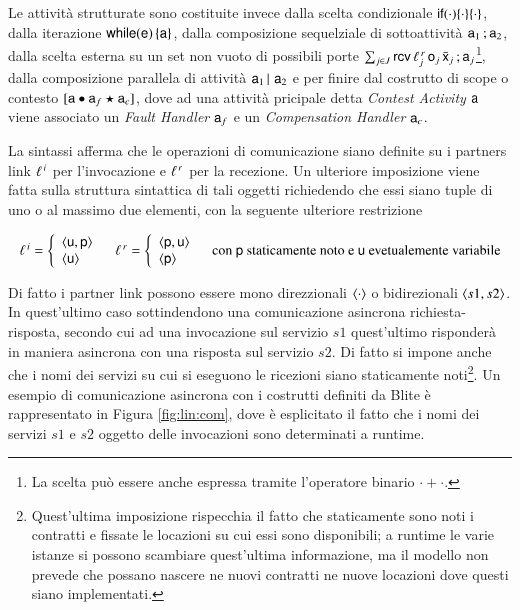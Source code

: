 Le attività strutturate sono costituite invece dalla scelta condizionale
${\sf if}(\cdot)\{ \cdot \}\{\cdot\}$, dalla iterazione ${\sf while}({\sf e})\, \{ {\sf a}\}$, dalla
composizione sequelziale di sottoattività ${\sf a}_1\, ;{\sf a}_2$, dalla scelta
esterna su un set non vuoto di possibili porte $\sum_{j \in
J}{\sf rcv}\,\ell^{\,r}_j\, {\sf o}_j\, \bar{{\sf x}}_j\, ;{\sf a}_j$\footnote{La scelta può
essere anche espressa tramite l'operatore binario $ \cdot + \cdot$.}, dalla
composizione parallela di attività ${\sf a}_1\,|\,\, {\sf a}_2$ e per finire dal costrutto di scope o contesto $[{\sf a} \bullet {\sf a}_f \star {\sf a}_c]$, dove ad una attività pricipale
detta \emph{Contest Activity} ${\sf a}$ viene associato un \emph{Fault Handler}
${\sf a}_f$ e un \emph{Compensation Handler} ${\sf a}_c$.

La sintassi afferma che le operazioni di comunicazione siano
definite su i partners link $\ell^{\,i}$ per l'invocazione e $\ell^{\,r}$ per la
recezione. Un ulteriore imposizione viene fatta sulla struttura sintattica di
tali oggetti richiedendo che essi siano tuple di uno o al massimo due elementi,
con la seguente ulteriore restrizione

$$
\begin{array}{ccc}

\plinv = \left\{ 
\begin{array}{l}
 \arr{\xu,\xp}   \\
 \arr{\xu}  
\end{array} \right.

&

\plrec = \left\{ 
\begin{array}{l}
 \arr{\xp,\xu}   \\
 \arr{\xp}  
\end{array} \right.

& \textrm{con } \xp \textrm{ staticamente noto e } \xu \textrm{
evetualemente variabile}

\end{array}
$$

Di fatto i partner link possono essere mono direzzionali $\langle \cdot \rangle$ o
bidirezionali $\langle s1, s2 \rangle$. In quest'ultimo caso sottindendono una
comunicazione asincrona richiesta-risposta, secondo cui ad una invocazione sul servizio $s1$
quest'ultimo risponderà in maniera asincrona con una risposta sul servizio $s2$.
Di fatto si impone anche che i nomi dei servizi su cui si eseguono le ricezioni
siano staticamente noti\footnote{Quest'ultima imposizione rispecchia il
fatto che staticamente sono noti i contratti e fissate le
locazioni su cui essi sono disponibili; a runtime le varie istanze si possono
scambiare quest'ultima informazione, ma il modello non prevede che possano
nascere ne nuovi contratti ne nuove locazioni dove questi siano implementati.}.
Un esempio di comunicazione asincrona con i costrutti definiti da Blite è
rappresentato in Figura \ref{fig:lin:com}, dove è esplicitato il fatto che i
nomi dei servizi $s1$ e $s2$ oggetto delle invocazioni sono determinati a
runtime.

